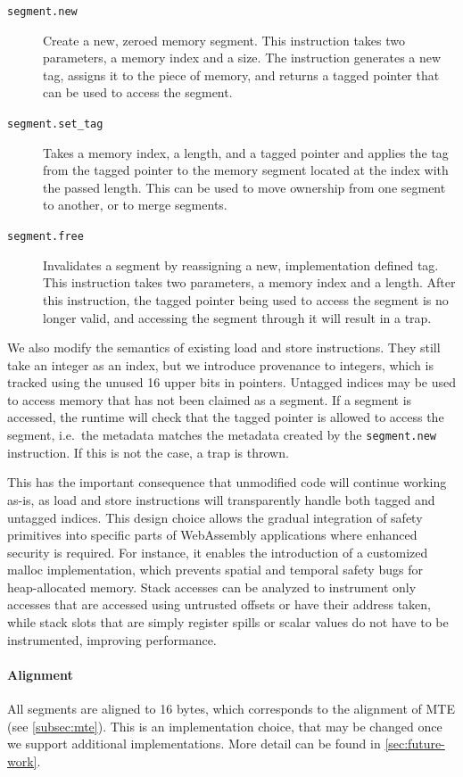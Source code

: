 \begin{description}
    \item[\texttt{segment.new}] Create a new, zeroed memory segment.
    This instruction takes two parameters, a memory index and a size.
    The instruction generates a new tag, assigns it to the piece of memory, and returns a tagged pointer that can be used to access the segment.
    \item[\texttt{segment.set\_tag}] Takes a memory index, a length, and a tagged pointer and applies the tag from the tagged pointer to the memory segment located at the index with the passed length.
    This can be used to move ownership from one segment to another, or to merge segments.
    \item[\texttt{segment.free}] Invalidates a segment by reassigning a new, implementation defined tag.
    This instruction takes two parameters, a memory index and a length.
    After this instruction, the tagged pointer being used to access the segment is no longer valid, and accessing the segment through it will result in a trap.
\end{description}

We also modify the semantics of existing load and store instructions.
They still take an integer as an index, but we introduce provenance to integers, which is tracked using the unused 16 upper bits in pointers.
Untagged indices may be used to access memory that has not been claimed as a segment.
If a segment is accessed, the runtime will check that the tagged pointer is allowed to access the segment, i.e.\ the metadata matches the metadata created by the \texttt{segment.new} instruction.
If this is not the case, a trap is thrown.

This has the important consequence that unmodified code will continue working as-is, as load and store instructions will transparently handle both tagged and untagged indices.
This design choice allows the gradual integration of safety primitives into specific parts of WebAssembly applications where enhanced security is required.
For instance, it enables the introduction of a customized malloc implementation, which prevents spatial and temporal safety bugs for heap-allocated memory.
Stack accesses can be analyzed to instrument only accesses that are accessed using untrusted offsets or have their address taken, while stack slots that are simply register spills or scalar values do not have to be instrumented, improving performance.

\paragraph{Alignment}
All segments are aligned to 16 bytes, which corresponds to the alignment of MTE (see \cref{subsec:mte}).
This is an implementation choice, that may be changed once we support additional implementations.
More detail can be found in \cref{sec:future-work}.

